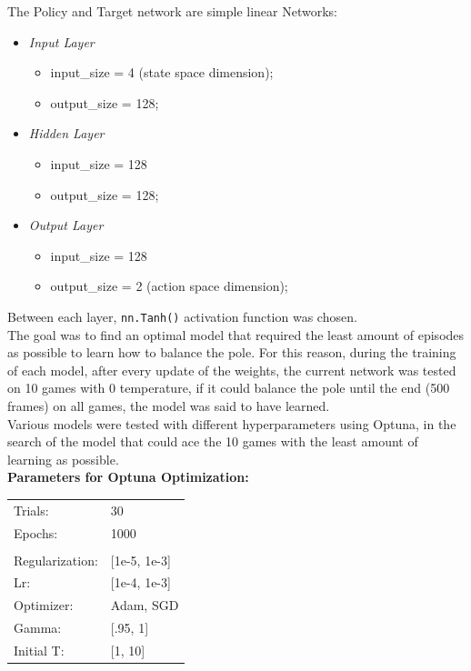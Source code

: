 \documentclass[11pt,a4paper,twocolumn]{IEEEtran}
\newcommand{\thinsepline}{\noindent\makebox[\linewidth]{\rule{7.5cm}{0.02pt}}}
\begin{document}
		
		The Policy and Target network are simple linear Networks:
		\begin{itemize}
			\item \textit{Input Layer}
			\begin{itemize}
				\item input\_size = 4 (state space dimension);
				\item output\_size = 128;
			\end{itemize}
			\item \textit{Hidden Layer}
			\begin{itemize}
				\item input\_size = 128
				\item output\_size = 128;
			\end{itemize}
			\item \textit{Output Layer}
			\begin{itemize}
				\item input\_size = 128
				\item output\_size = 2 (action space dimension);
			\end{itemize}
		\end{itemize}
		Between each layer, \texttt{nn.Tanh()} activation function was chosen.\medskip\\
		
		The goal was to find an optimal model that required the least amount of episodes as possible to learn how to balance the pole. For this reason, during the training of each model, after every update of the weights, the current network was tested on 10 games with 0 temperature, if it could balance the pole until the end (500 frames) on all games, the model was said
		to have learned.\medskip\\
		
		Various models were tested with different hyperparameters using Optuna, in the search of the model that could ace the 10 games with the least amount of learning as possible.
		\thinsepline\\
		\textbf{Parameters for Optuna Optimization:}\medskip\\
		\begin{tabular}{ll}
			Trials: & 30 \\
			Epochs: & 1000 \\
			\hline\vspace*{-.4cm}\\
			Regularization: & [1e-5, 1e-3] \\
			Lr: & [1e-4, 1e-3] \\
			Optimizer: & Adam, SGD\\
			Gamma: & [.95, 1]\\
			Initial T:& [1, 10]\\
		\end{tabular}\\
		\thinsepline\\
		\newpage
\end{document}
